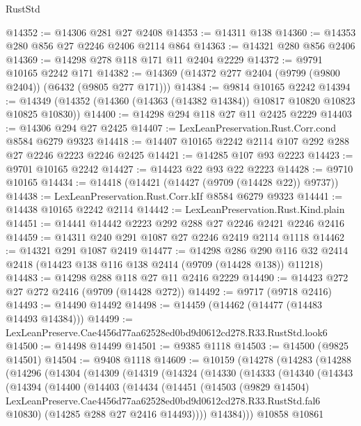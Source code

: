 \begin{lexlean}{RustStd}
\begin{coremodule}
@14352 := @14306 @281 @27 @2408
@14353 := @14311 @138
@14360 := @14353 @280 @856 @27 @2246 @2406 @2114 @864
@14363 := @14321 @280 @856 @2406
@14369 := @14298 @278 @118 @171 @11 @2404 @2229
@14372 := @9791 @10165 @2242 @171
@14382 := @14369 (@14372 @277 @2404 (@9799 (@9800 @2404)) (@6432 (@9805 @277 @171)))
@14384 := @9814 @10165 @2242
@14394 := @14349 (@14352 (@14360 (@14363 (@14382 @14384)) @10817 @10820 @10823 @10825 @10830))
@14400 := @14298 @294 @118 @27 @11 @2425 @2229
@14403 := @14306 @294 @27 @2425
@14407 := LexLeanPreservation.Rust.Corr.cond @8584 @6279 @9323
@14418 := @14407 @10165 @2242 @2114 @107 @292 @288 @27 @2246 @2223 @2246 @2425
@14421 := @14285 @107 @93 @2223
@14423 := @9701 @10165 @2242
@14427 := @14423 @22 @93 @22 @2223
@14428 := @9710 @10165
@14434 := @14418 (@14421 (@14427 (@9709 (@14428 @22)) @9737))
@14438 := LexLeanPreservation.Rust.Corr.kIf @8584 @6279 @9323
@14441 := @14438 @10165 @2242 @2114
@14442 := LexLeanPreservation.Rust.Kind.plain
@14451 := @14441 @14442 @2223 @292 @288 @27 @2246 @2421 @2246 @2416
@14459 := @14311 @240 @291 @1087 @27 @2246 @2419 @2114 @1118
@14462 := @14321 @291 @1087 @2419
@14477 := @14298
    @286
    @290
    @116
    @32
    @2414
    @2418
    (@14423 @138 @116 @138 @2414 (@9709 (@14428 @138)) @11218)
@14483 := @14298 @288 @118 @27 @11 @2416 @2229
@14490 := @14423 @272 @27 @272 @2416 (@9709 (@14428 @272))
@14492 := @9717 (@9718 @2416)
@14493 := @14490 @14492
@14498 := @14459 (@14462 (@14477 (@14483 @14493 @14384)))
@14499 := LexLeanPreserve.Cae4456d77aa62528ed0bd9d0612cd278.R33.RustStd.look6
@14500 := @14498 @14499
@14501 := @9385 @1118
@14503 := @14500 (@9825 @14501)
@14504 := @9408 @1118
@14609 := @10159
    (@14278
      (@14283
        (@14288
          (@14296
            (@14304
              (@14309
                (@14319
                  (@14324
                    (@14330
                      (@14333
                        (@14340
                          (@14343
                            (@14394
                              (@14400
                                (@14403
                                  (@14434
                                    (@14451
                                      (@14503
                                        (@9829 @14504)
                                        LexLeanPreserve.Cae4456d77aa62528ed0bd9d0612cd278.R33.RustStd.fal6
                                        @10830)
                                      (@14285 @288 @27 @2416 @14493))))
                                @14384)))
                          @10858
                          @10861

\end{coremodule}
\end{lexlean}
